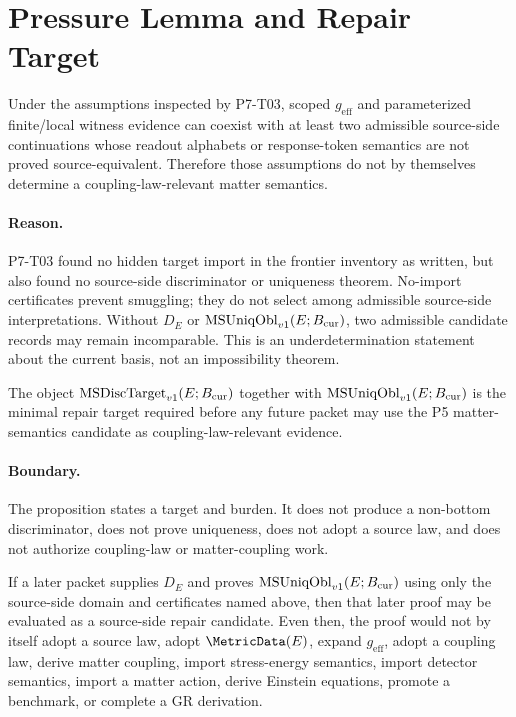 \section{Pressure Lemma and Repair Target}

\begin{lemma}
Under the assumptions inspected by P7-T03, scoped \(g_{\mathrm{eff}}\) and
parameterized finite/local witness evidence can coexist with at least two
admissible source-side continuations whose readout alphabets or response-token
semantics are not proved source-equivalent.  Therefore those assumptions do
not by themselves determine a coupling-law-relevant matter semantics.
\end{lemma}

\paragraph{Reason.}
P7-T03 found no hidden target import in the frontier inventory as written, but
also found no source-side discriminator or uniqueness theorem.  No-import
certificates prevent smuggling; they do not select among admissible source-side
interpretations.  Without \(D_E\) or \(\mathrm{MSUniqObl}_{v1}(E;B_{\mathrm{cur}})\), two admissible
candidate records may remain incomparable.  This is an underdetermination
statement about the current basis, not an impossibility theorem.

\begin{proposition}
The object \(\mathrm{MSDiscTarget}_{v1}(E;B_{\mathrm{cur}})\) together with \(\mathrm{MSUniqObl}_{v1}(E;B_{\mathrm{cur}})\) is the
minimal repair target required before any future packet may use the P5
matter-semantics candidate as coupling-law-relevant evidence.
\end{proposition}

\paragraph{Boundary.}
The proposition states a target and burden.  It does not produce a
non-bottom discriminator, does not prove uniqueness, does not adopt a source
law, and does not authorize coupling-law or matter-coupling work.

\begin{proposition}
If a later packet supplies \(D_E\) and proves \(\mathrm{MSUniqObl}_{v1}(E;B_{\mathrm{cur}})\) using only
the source-side domain and certificates named above, then that later proof may
be evaluated as a source-side repair candidate.  Even then, the proof would
not by itself adopt a source law, adopt \(\MetricData(E)\), expand
\(g_{\mathrm{eff}}\), adopt a coupling law, derive matter coupling, import
stress-energy semantics, import detector semantics, import a matter action,
derive Einstein equations, promote a benchmark, or complete a GR derivation.
\end{proposition}


